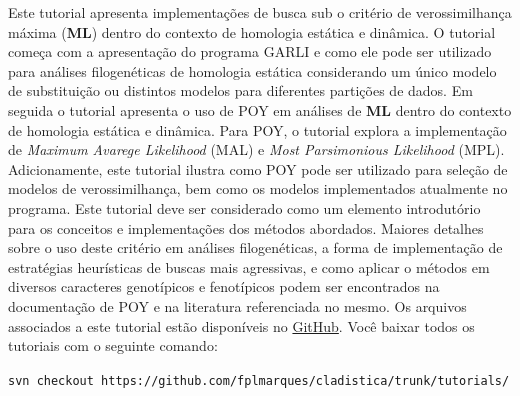Este tutorial apresenta implementações de busca sub o critério de verossimilhança máxima (\textbf{ML}) dentro do contexto de homologia estática e dinâmica. O tutorial começa com a apresentação do programa GARLI e como ele pode ser utilizado para análises filogenéticas de homologia estática considerando um único modelo de substituição ou distintos modelos para diferentes partições de dados. Em seguida o tutorial apresenta o uso de POY em análises de \textbf{ML} dentro do contexto de homologia estática e dinâmica. Para POY, o tutorial explora a implementação de \textit{Maximum Avarege Likelihood} (MAL) e \textit{Most Parsimonious Likelihood} (MPL). Adicionamente, este tutorial ilustra como POY pode ser utilizado para seleção de modelos de verossimilhança, bem como os modelos implementados atualmente no programa. Este tutorial deve ser considerado como um elemento introdutório para os conceitos e implementações dos métodos abordados. Maiores detalhes sobre o uso deste critério em análises filogenéticas, a forma de implementação de estratégias heurísticas de buscas mais agressivas, e como aplicar o métodos em diversos caracteres genotípicos e fenotípicos podem ser encontrados na documentação de POY e na literatura referenciada no mesmo. Os arquivos associados a este tutorial estão disponíveis no \href{https://github.com/fplmarques/cladistica/tree/main/tutorials/}{GitHub}. Você baixar todos os tutoriais com o seguinte comando:

\begin{center}
\small \texttt{svn checkout https://github.com/fplmarques/cladistica/trunk/tutorials/}\\
\end{center}


